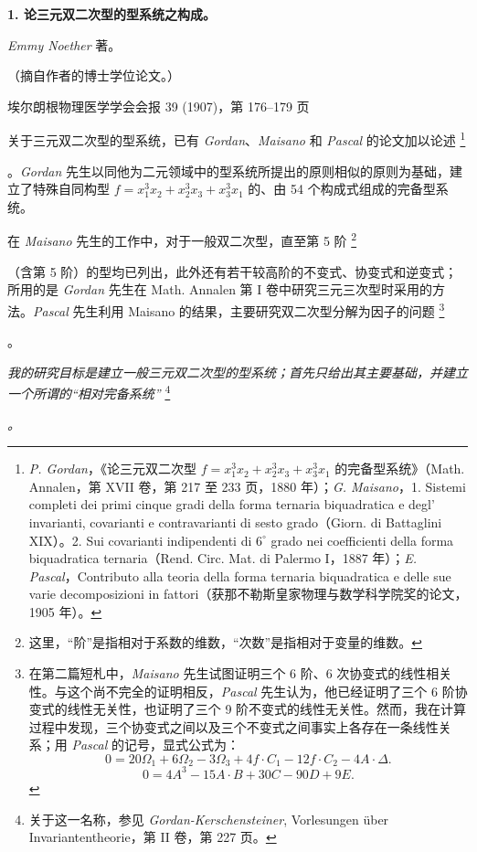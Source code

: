 \documentclass[11pt]{article}
\providecommand{\srcfn}[2]{%
  \begingroup
  \renewcommand{\thefootnote}{#1}%
  \footnote{#2}%
  \addtocounter{footnote}{-1}%
  \endgroup}
\providecommand{\srcspaced}[1]{\emph{#1}}
\providecommand{\glqq}{“}
\providecommand{\grqq}{”}
\begin{document}
\setcounter{footnote}{0}

\begin{center}
{\Large\bfseries 1. 论三元双二次型的型系统之构成。}\par
\vspace{1.2em}
\srcspaced{Emmy Noether} 著。\par
\vspace{0.8em}
（摘自作者的博士学位论文。）\par
\vspace{1.2em}
埃尔朗根物理医学学会会报 39 (1907)，第 176--179 页
\end{center}

关于三元双二次型的型系统，已有 \srcspaced{Gordan}、\srcspaced{Maisano} 和 \srcspaced{Pascal} 的论文加以论述\srcfn{1)}{\srcspaced{P. Gordan}，《论三元双二次型 \(f=x_1^3x_2+x_2^3x_3+x_3^3x_1\) 的完备型系统》（Math. Annalen，第 XVII 卷，第 217 至 233 页，1880 年）；\srcspaced{G. Maisano}，1. Sistemi completi dei primi cinque gradi della forma ternaria biquadratica e degl' invarianti, covarianti e contravarianti di sesto grado（Giorn. di Battaglini XIX）。2. Sui covarianti indipendenti di \(6^\circ\) grado nei coefficienti della forma biquadratica ternaria（Rend. Circ. Mat. di Palermo I，1887 年）；\srcspaced{E. Pascal}，Contributo alla teoria della forma ternaria biquadratica e delle sue varie decomposizioni in fattori（获那不勒斯皇家物理与数学科学院奖的论文，1905 年）。}。\srcspaced{Gordan} 先生以同他为二元领域中的型系统所提出的原则相似的原则为基础，建立了特殊自同构型 \(f=x_1^3x_2+x_2^3x_3+x_3^3x_1\) 的、由 54 个构成式组成的完备型系统。

在 \srcspaced{Maisano} 先生的工作中，对于一般双二次型，直至第 5 阶\srcfn{2)}{这里，\glqq{}阶\grqq{}是指相对于系数的维数，\glqq{}次数\grqq{}是指相对于变量的维数。}（含第 5 阶）的型均已列出，此外还有若干较高阶的不变式、协变式和逆变式；所用的是 \srcspaced{Gordan} 先生在 Math. Annalen 第 I 卷中研究三元三次型时采用的方法。\srcspaced{Pascal} 先生利用 Maisano 的结果，主要研究双二次型分解为因子的问题\srcfn{1)}{在第二篇短札中，\srcspaced{Maisano} 先生试图证明三个 6 阶、6 次协变式的线性相关性。与这个尚不完全的证明相反，\srcspaced{Pascal} 先生认为，他已经证明了三个 6 阶协变式的线性无关性，也证明了三个 9 阶不变式的线性无关性。然而，我在计算过程中发现，三个协变式之间以及三个不变式之间事实上各存在一条线性关系；用 \srcspaced{Pascal} 的记号，显式公式为：
\[
0=20\Omega_1+6\Omega_2-3\Omega_3+4f\cdot C_1-12f\cdot C_2-4A\cdot\Delta.
\]
\[
0=4A^3-15A\cdot B+30C-90D+9E.
\]}。

\srcspaced{我的研究目标是建立一般三元双二次型的型系统；首先只给出其主要基础，并建立一个所谓的\glqq{}相对完备系统\grqq{}}\srcfn{2)}{关于这一名称，参见 \srcspaced{Gordan-Kerschensteiner}, Vorlesungen über Invariantentheorie，第 II 卷，第 227 页。}\srcspaced{。}
\end{document}
